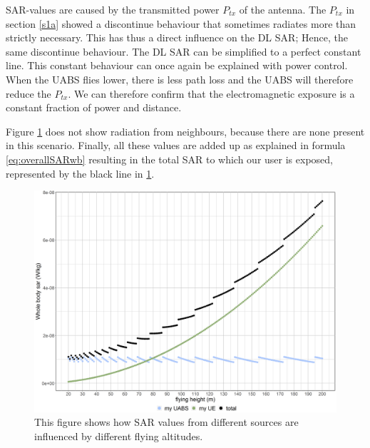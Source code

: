 \gls{SAR}-values are caused by the transmitted power  $P_{tx}$ of the antenna. The $P_{tx}$ in section \ref{s1a}
showed a discontinue behaviour that sometimes radiates more than strictly necessary. This has thus a direct influence
on the \gls{DL} \gls{SAR}; Hence, the same discontinue behaviour. The \gls{DL} \gls{SAR} can be simplified to a perfect constant line.
This constant behaviour can once again be explained with power control. When the \gls{UABS} flies lower, there is less path loss and the \gls{UABS} 
will therefore reduce the $P_{tx}$. We can therefore confirm that the electromagnetic exposure is a constant fraction of power and distance.


Figure \ref{fig:s1_fhsar} does not show radiation from neighbours, because there are none present in this scenario. 
Finally, all these values are added up as explained in formula \ref{eq:overallSARwb} resulting in the total \gls{SAR}
to which our user is exposed, represented by the black line in \ref{fig:s1_fhsar}.

\begin{figure}[]
  \includegraphics[width=\textwidth]{../results/s1/fhvssar.png}
  \caption{This figure shows how SAR values from different sources are influenced by different flying altitudes.}
  \label{fig:s1_fhsar}
\end{figure}

